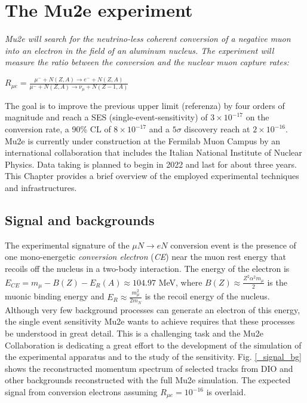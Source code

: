 \documentclass[12pt,a4paper,openright, oneside, titlepage]{book} %
\begin{document}
\chapter{The Mu2e experiment}
{\itshape 
Mu2e will search for the neutrino-less coherent conversion of a negative muon into an electron
in the field of an aluminum nucleus. The experiment will measure the ratio between the conversion 
and the nuclear muon capture rates:

\begin{center}
$R_{\mu e} = \frac{\mu^- + N(Z, A) \rightarrow e^- + N(Z, A)}
{\mu^- + N(Z,A) \rightarrow \nu_{\mu} + N(Z-1, A)}$
\end{center}

\noindent
The goal is to improve the previous upper limit (referenza) by four orders of magnitude and reach
a SES (single-event-sensitivity) of $3\times 10^{-17}$ on the conversion rate, a 90\% CL of $8\times 10^{-17}$
and a $5\sigma$ discovery reach at $2\times 10^{-16}$. Mu2e is currently under construction at 
the Fermilab Muon Campus by an international collaboration that includes the Italian National Institute
of Nuclear Physics. Data taking is planned to begin in 2022 and last for about three years. 
This Chapter provides 
a brief overview of the employed experimental techniques and infrastructures.}




\section{Signal and backgrounds}

The experimental signature of the $\mu N \rightarrow eN$ conversion event is the presence of one
mono-energetic  \textit{conversion electron} (\textit{CE}) near the muon rest energy that recoils off the nucleus in a two-body interaction.
The energy of the electron is $E_{CE} = m_\mu -B(Z) -E_R(A) \approx 104.97$ MeV,
where  $B(Z)\approx\frac{Z^2\alpha^2m_\mu}{2}$ is the muonic binding energy 
and $E_R\approx\frac{m_\mu^2}{2m_N}$ is the recoil energy of the nucleus.
Although very few background processes can generate an electron of this energy,
the single event sensitivity Mu2e wants to achieve requires that these processes
be understood in great detail. This is a challenging task and the Mu2e Collaboration
is dedicating a great effort to the development of the simulation of the experimental
apparatus and to the study of the sensitivity. 
Fig. \ref{_signal_bg} shows the reconstructed momentum spectrum of selected tracks
from DIO and other backgrounds reconstructed with the full Mu2e simulation. 
The expected signal from conversion electrons assuming 
$R_{\mu e} = 10^{-16}$ is overlaid. 
\end{document}
